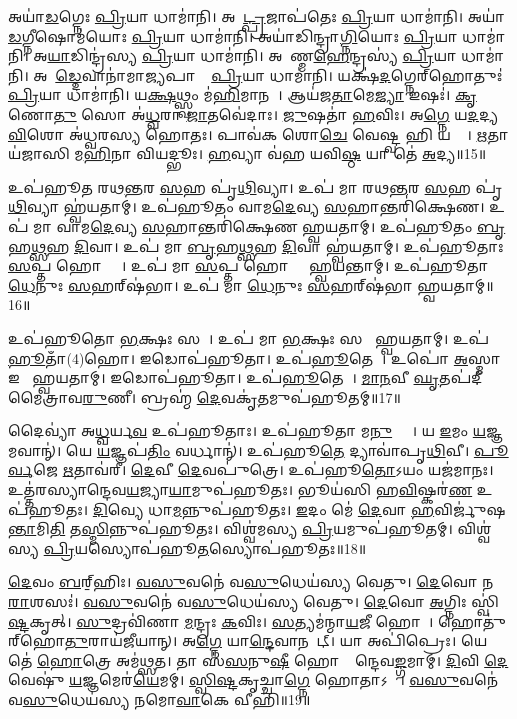 𑌅𑌯𑌾॑\ul{𑌡}𑌗𑍍𑌨𑍇𑌃 \ul{𑌪𑍍𑌰𑌿}𑌯𑌾 𑌧𑌾𑌮𑌾॑𑌨𑌿।
𑌅𑌯𑌾᳚\ul{𑌟𑍍𑌪𑍍𑌰}𑌜𑌾𑌪॑𑌤𑍇𑌃 \ul{𑌪𑍍𑌰𑌿}𑌯𑌾 𑌧𑌾𑌮𑌾॑𑌨𑌿।
𑌅𑌯𑌾॑\ul{𑌡}𑌗𑍍𑌨𑍀𑌷𑍋𑌮॑𑌯𑍋𑌃 \ul{𑌪𑍍𑌰𑌿}𑌯𑌾 𑌧𑌾𑌮𑌾॑𑌨𑌿।
𑌅𑌯𑌾॑𑌡𑌿𑌨𑍍𑌦𑍍𑌰𑌾\ul{𑌗𑍍𑌨𑌿}𑌯𑍋𑌃 \ul{𑌪𑍍𑌰𑌿}𑌯𑌾 𑌧𑌾𑌮𑌾॑𑌨𑌿।
𑌅\ul{𑌯𑌾}𑌡𑌿𑌨𑍍𑌦𑍍𑌰॑𑌸𑍍𑌯 \ul{𑌪𑍍𑌰𑌿}𑌯𑌾 𑌧𑌾𑌮𑌾॑𑌨𑌿।
𑌅𑌯𑌾᳚𑌣𑍍𑌮\ul{𑌹𑍇}𑌨𑍍𑌦𑍍𑌰𑌸𑍍𑌯॑ \ul{𑌪𑍍𑌰𑌿}𑌯𑌾 𑌧𑌾𑌮𑌾॑𑌨𑌿।
𑌅𑌯𑌾᳚\ul{𑌡𑍍𑌦𑍇}𑌵𑌾𑌨𑌾॑𑌮𑌾\ul{𑌜𑍍𑌯}𑌪𑌾𑌨𑌾𑌂᳚ \ul{𑌪𑍍𑌰𑌿}𑌯𑌾 𑌧𑌾𑌮𑌾॑𑌨𑌿।
𑌯𑌕𑍍𑌷॑\ul{𑌦}𑌗𑍍𑌨𑍇𑌰𑍍‌\mbox{}𑌹𑍋𑌤𑍁𑌃॑ \ul{𑌪𑍍𑌰𑌿}𑌯𑌾 𑌧𑌾𑌮𑌾॑𑌨𑌿।
𑌯\ul{𑌕𑍍𑌷}𑌥𑍍𑌸𑍍𑌵𑌂 𑌮॑\ul{𑌹𑌿}𑌮𑌾𑌨𑌮𑍍᳚।
𑌆𑌯॑𑌜\ul{𑌤𑌾}𑌮𑍇\ul{𑌜𑍍𑌯𑌾} 𑌇𑌷𑌃॑।
\ul{𑌕𑍃}𑌣𑍋\ul{𑌤𑍁} 𑌸𑍋 𑌅॑\ul{𑌧𑍍𑌵}𑌰𑌾 \ul{𑌜𑌾}𑌤𑌵𑍇॑𑌦𑌾𑌃।
\ul{𑌜𑍁}𑌷𑌤𑌾॑ \ul{𑌹}𑌵𑌿𑌃।
𑌅\ul{𑌗𑍍𑌨𑍇} 𑌯\ul{𑌦}𑌦𑍍𑌯 \ul{𑌵𑌿}𑌶𑍋 𑌅॑𑌧𑍍𑌵𑌰𑌸𑍍𑌯 𑌹𑍋𑌤𑌃।
𑌪𑌾𑌵॑𑌕 𑌶𑍋\ul{𑌚𑍇} 𑌵𑍇𑌷𑍍𑌟𑍍𑌵 𑌹𑌿 𑌯𑌜𑍍𑌵𑌾᳚।
\ul{𑌋}𑌤𑌾 𑌯॑𑌜𑌾𑌸𑌿 𑌮\ul{𑌹𑌿}𑌨𑌾 𑌵𑌿𑌯𑌦𑍍𑌭𑍂𑌃।
\ul{𑌹}𑌵𑍍𑌯𑌾 𑌵॑𑌹 𑌯𑌵𑌿\ul{𑌷𑍍𑌠} 𑌯𑌾 𑌤𑍇॑ \ul{𑌅}𑌦𑍍𑌯॥15॥

𑌉𑌪॑𑌹𑍂𑌤 𑌰𑌥\ul{𑌨𑍍𑌤}𑌰 \ul{𑌸}𑌹 𑌪𑍃॑\ul{𑌥𑌿}𑌵𑍍𑌯𑌾।
𑌉𑌪॑ 𑌮𑌾 𑌰𑌥\ul{𑌨𑍍𑌤}𑌰 \ul{𑌸}𑌹 𑌪𑍃॑\ul{𑌥𑌿}𑌵𑍍𑌯𑌾 𑌹𑍍𑌵॑𑌯𑌤𑌾𑌮𑍍।
𑌉𑌪॑𑌹𑍂𑌤𑌂 𑌵𑌾𑌮\ul{𑌦𑍇}𑌵𑍍𑌯 \ul{𑌸}𑌹𑌾𑌨𑍍𑌤𑌰𑌿॑𑌕𑍍𑌷𑍇𑌣।
𑌉𑌪॑ 𑌮𑌾 𑌵𑌾𑌮\ul{𑌦𑍇}𑌵𑍍𑌯 \ul{𑌸}𑌹𑌾𑌨𑍍𑌤𑌰𑌿॑𑌕𑍍𑌷𑍇𑌣 𑌹𑍍𑌵𑌯𑌤𑌾𑌮𑍍।
𑌉𑌪॑𑌹𑍂𑌤𑌂 \ul{𑌬𑍃}𑌹\ul{𑌥𑍍𑌸}𑌹 \ul{𑌦𑌿}𑌵𑌾।
𑌉𑌪॑ 𑌮𑌾 \ul{𑌬𑍃}𑌹\ul{𑌥𑍍𑌸}𑌹 \ul{𑌦𑌿}𑌵𑌾 𑌹𑍍𑌵॑𑌯𑌤𑌾𑌮𑍍।
𑌉𑌪॑𑌹𑍂𑌤𑌾𑌃 \ul{𑌸}𑌪𑍍𑌤 𑌹𑍋𑌤𑍍𑌰𑌾𑌃᳚।
𑌉𑌪॑ 𑌮𑌾 \ul{𑌸}𑌪𑍍𑌤 𑌹𑍋𑌤𑍍𑌰𑌾᳚ 𑌹𑍍𑌵𑌯𑌨𑍍𑌤𑌾𑌮𑍍।
𑌉𑌪॑𑌹𑍂𑌤𑌾 \ul{𑌧𑍇}𑌨𑍁𑌃 \ul{𑌸}𑌹𑌰𑍍‌\mbox{}𑌷॑𑌭𑌾।
𑌉𑌪॑ 𑌮𑌾 \ul{𑌧𑍇}𑌨𑍁𑌃 \ul{𑌸}𑌹𑌰𑍍‌\mbox{}𑌷॑𑌭𑌾 𑌹𑍍𑌵𑌯𑌤𑌾𑌮𑍍॥16॥

𑌉𑌪॑𑌹𑍂𑌤𑍋 \ul{𑌭}𑌕𑍍𑌷𑌃 𑌸𑌖𑌾᳚।
𑌉𑌪॑ 𑌮𑌾 \ul{𑌭}𑌕𑍍𑌷𑌃 𑌸𑌖𑌾᳚ 𑌹𑍍𑌵𑌯𑌤𑌾𑌮𑍍।
𑌉𑌪॑\ul{𑌹𑍂}𑌤𑌾𑌁(4)𑌹𑍋।
𑌇𑌡𑍋𑌪॑𑌹𑍂𑌤𑌾।
𑌉𑌪॑\ul{𑌹𑍂}𑌤𑍇𑌡𑌾᳚।
𑌉𑌪𑍋॑ \ul{𑌅}𑌸𑍍𑌮𑌾 𑌇𑌡𑌾᳚ 𑌹𑍍𑌵𑌯𑌤𑌾𑌮𑍍।
𑌇𑌡𑍋𑌪॑𑌹𑍂𑌤𑌾।
𑌉𑌪॑\ul{𑌹𑍂}𑌤𑍇𑌡𑌾᳚।
\ul{𑌮𑌾}\ul{𑌨}𑌵𑍀 \ul{𑌘𑍃}𑌤𑌪॑𑌦𑍀 𑌮𑍈𑌤𑍍𑌰𑌾𑌵\ul{𑌰𑍁}𑌣𑍀।
𑌬𑍍𑌰𑌹𑍍𑌮॑ \ul{𑌦𑍇}𑌵𑌕𑍃॑\ul{𑌤}𑌮𑍁𑌪॑𑌹𑍂𑌤𑌮𑍍॥17॥

𑌦𑍈𑌵𑍍𑌯𑌾॑ 𑌅\ul{𑌧𑍍𑌵}𑌰𑍍𑌯\ul{𑌵} 𑌉𑌪॑𑌹𑍂𑌤𑌾𑌃।
𑌉𑌪॑𑌹𑍂𑌤𑌾 𑌮\ul{𑌨𑍁}𑌷𑍍𑌯𑌾𑌃᳚।
𑌯 \ul{𑌇}𑌮𑌂 \ul{𑌯}𑌜𑍍𑌞𑌮𑌵𑌾𑌨𑍍॑।
𑌯𑍇 \ul{𑌯}𑌜𑍍𑌞𑌪॑\ul{𑌤𑌿𑌂} 𑌵𑌰𑍍𑌧𑌾𑌨𑍍॑।
𑌉𑌪॑𑌹𑍂\ul{𑌤𑍇} 𑌦𑍍𑌯𑌾𑌵𑌾॑𑌪𑍃\ul{𑌥𑌿}𑌵𑍀।
\ul{𑌪𑍂}\ul{𑌰𑍍𑌵}𑌜𑍇 \ul{𑌋}𑌤𑌾𑌵॑𑌰𑍀।
\ul{𑌦𑍇}𑌵𑍀 \ul{𑌦𑍇}𑌵𑌪𑍁॑𑌤𑍍𑌰𑍇।
𑌉𑌪॑𑌹𑍂\ul{𑌤𑍋}𑌽𑌯𑌂 𑌯𑌜॑𑌮𑌾𑌨𑌃।
𑌉𑌤𑍍𑌤॑𑌰𑌸𑍍𑌯𑌾𑌨𑍍𑌦𑍇𑌵\ul{𑌯}𑌜𑍍𑌯𑌾\ul{𑌯𑌾}𑌮𑍁𑌪॑𑌹𑍂𑌤𑌃।
𑌭𑍂𑌯॑𑌸𑌿 𑌹\ul{𑌵𑌿}𑌷𑍍𑌕𑌰॑\ul{𑌣} 𑌉𑌪॑𑌹𑍂𑌤𑌃।
\ul{𑌦𑌿}𑌵𑍍𑌯𑍇 𑌧𑌾\ul{𑌮}𑌨𑍍𑌨𑍁𑌪॑𑌹𑍂𑌤𑌃।
\ul{𑌇}𑌦𑌂 𑌮𑍇॑ \ul{𑌦𑍇}𑌵𑌾 \ul{𑌹}𑌵𑌿𑌰𑍍𑌜𑍁॑𑌷\ul{𑌨𑍍𑌤𑌾}𑌮𑌿\ul{𑌤𑌿} 𑌤\ul{𑌸𑍍𑌮𑌿}𑌨𑍍𑌨𑍁𑌪॑𑌹𑍂𑌤𑌃।
𑌵𑌿𑌶𑍍𑌵॑𑌮𑌸𑍍𑌯 \ul{𑌪𑍍𑌰𑌿}𑌯𑌮𑍁𑌪॑𑌹𑍂𑌤𑌮𑍍।
𑌵𑌿𑌶𑍍𑌵॑𑌸𑍍𑌯 \ul{𑌪𑍍𑌰𑌿}𑌯𑌸𑍍𑌯𑍋𑌪॑𑌹𑍂\ul{𑌤}𑌸𑍍𑌯𑍋𑌪॑𑌹𑍂𑌤𑌃॥18॥

\ul{𑌦𑍇}𑌵𑌂 \ul{𑌬}𑌰𑍍‌॒\mbox{}𑌹𑌿𑌃।
\ul{𑌵}\ul{𑌸𑍁}𑌵𑌨𑍇॑ 𑌵\ul{𑌸𑍁}𑌧𑍇𑌯॑𑌸𑍍𑌯 𑌵𑍇𑌤𑍁।
\ul{𑌦𑍇}𑌵𑍋 𑌨\ul{𑌰𑌾}𑌶𑌸𑌃॑।
\ul{𑌵}\ul{𑌸𑍁}𑌵𑌨𑍇॑ 𑌵\ul{𑌸𑍁}𑌧𑍇𑌯॑𑌸𑍍𑌯 𑌵𑍇𑌤𑍁।
\ul{𑌦𑍇}𑌵𑍋 \ul{𑌅}𑌗𑍍𑌨𑌿𑌃 𑌸𑍍𑌵𑌿॑\ul{𑌷𑍍𑌟}𑌕𑍃𑌤𑍍।
\ul{𑌸𑍁}𑌦𑍍𑌰𑌵𑌿॑𑌣𑌾 \ul{𑌮}𑌨𑍍𑌦𑍍𑌰𑌃 \ul{𑌕}𑌵𑌿𑌃।
\ul{𑌸}𑌤𑍍𑌯𑌮॑𑌨𑍍𑌮𑌾\ul{𑌯}𑌜𑍀 𑌹𑍋𑌤𑌾᳚।
𑌹𑍋𑌤𑍁॑𑌰𑍍‌\mbox{}𑌹𑍋\ul{𑌤𑍁}𑌰𑌾𑌯॑𑌜𑍀𑌯𑌾𑌨𑍍।
𑌅\ul{𑌗𑍍𑌨𑍇} 𑌯𑌾\ul{𑌨𑍍𑌦𑍇}𑌵𑌾𑌨𑌯𑌾᳚𑌟𑍍।
𑌯𑌾 𑌅𑌪𑌿॑𑌪𑍍𑌰𑍇𑌃।
𑌯𑍇 𑌤𑍇॑ \ul{𑌹𑍋}𑌤𑍍𑌰𑍇 𑌅𑌮॑𑌥𑍍𑌸𑌤।
𑌤𑌾 𑌸॑\ul{𑌸}𑌨𑍁\ul{𑌷𑍀}\ul{} 𑌹𑍋𑌤𑍍𑌰𑌾᳚𑌨𑍍𑌦𑍇𑌵\ul{𑌙𑍍𑌗}𑌮𑌾𑌮𑍍।
\ul{𑌦𑌿}𑌵𑌿 \ul{𑌦𑍇}𑌵𑍇𑌷𑍁॑ \ul{𑌯}𑌜𑍍𑌞𑌮𑍇𑌰॑\ul{𑌯𑍇}𑌮𑌮𑍍।
\ul{𑌸𑍍𑌵𑌿}\ul{𑌷𑍍𑌟}𑌕𑍃𑌚𑍍𑌚𑌾\ul{𑌗𑍍𑌨𑍇} 𑌹𑍋𑌤𑌾\-𑌽𑌭𑍂𑌃᳚।
\ul{𑌵}\ul{𑌸𑍁}𑌵𑌨𑍇॑ 𑌵\ul{𑌸𑍁}𑌧𑍇𑌯॑𑌸𑍍𑌯 𑌨𑌮𑍋\ul{𑌵𑌾}𑌕𑍇 𑌵𑍀𑌹𑌿॑॥19॥\anuvakamend[𑌅𑌪𑌿॑\ul{𑌪𑍍𑌰𑍇𑌃} 𑌪𑌞𑍍𑌚॑ 𑌚]

